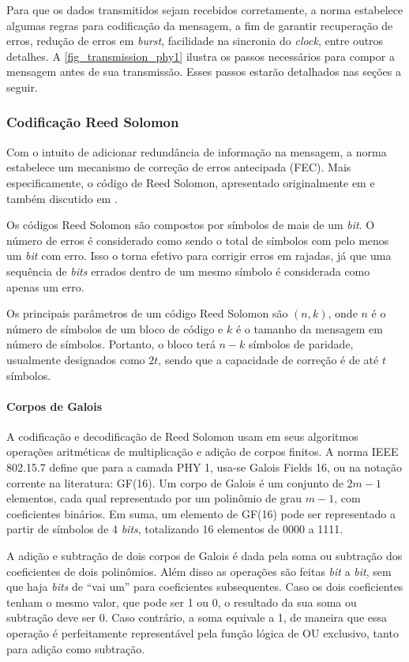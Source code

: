 	Para que os dados transmitidos sejam recebidos corretamente, a norma estabelece algumas regras para codificação da mensagem, a fim de garantir recuperação de erros, redução de erros em \emph{burst}, facilidade na sincronia do \textit{clock}, entre outros detalhes. A \autoref{fig_transmission_phy1} ilustra os passos necessários para compor a mensagem antes de sua transmissão. Esses passos estarão detalhados nas seções a seguir.


	\subsubsection*{Codificação Reed Solomon}

	Com o intuito de adicionar redundância de informação na mensagem, a norma estabelece um mecanismo de correção de erros antecipada (FEC). Mais especificamente, o código de Reed Solomon, apresentado originalmente em \cite{reed-solomon-original} e também discutido em \cite{rs-bbc}.

	Os códigos Reed Solomon são compostos por símbolos de mais de um \textit{bit}. O número de erros é considerado como sendo o total de símbolos com pelo menos um \textit{bit} com erro. Isso o torna efetivo para corrigir erros em rajadas, já que uma sequência de \textit{bits} errados dentro de um mesmo símbolo é considerada como apenas um erro.

	Os principais parâmetros de um código Reed Solomon são $(n, k)$, onde $n$ é o número de símbolos de um bloco de código e $k$ é o tamanho da mensagem em número de símbolos. Portanto, o bloco terá $n - k$ símbolos de paridade, usualmente designados como $2t$, sendo que a capacidade de correção é de até $t$ símbolos.

	\paragraph*{Corpos de Galois}

	A codificação e decodificação de Reed Solomon usam em seus algoritmos operações aritméticas de multiplicação e adição de corpos finitos. A norma IEEE 802.15.7 define que para a camada PHY 1, usa-se Galois Fields 16, ou na notação corrente na literatura: GF(16). Um corpo de Galois é um conjunto de $2m - 1$ elementos, cada qual representado por um polinômio de grau $m - 1$, com coeficientes binários. Em suma, um elemento de GF(16) pode ser representado a partir de símbolos de 4 \textit{bits}, totalizando 16 elementos de 0000 a 1111.

	A adição e subtração de dois corpos de Galois é dada pela soma ou subtração dos coeficientes de dois polinômios. Além disso as operações são feitas \textit{bit} a \textit{bit}, sem que haja \textit{bits} de ``vai um'' para coeficientes subsequentes. Caso os dois coeficientes tenham o mesmo valor, que pode ser 1 ou 0, o resultado da sua soma ou subtração deve ser 0. Caso contrário, a soma equivale a 1, de maneira que essa operação é perfeitamente representável pela função lógica de OU exclusivo, tanto para adição como subtração.

